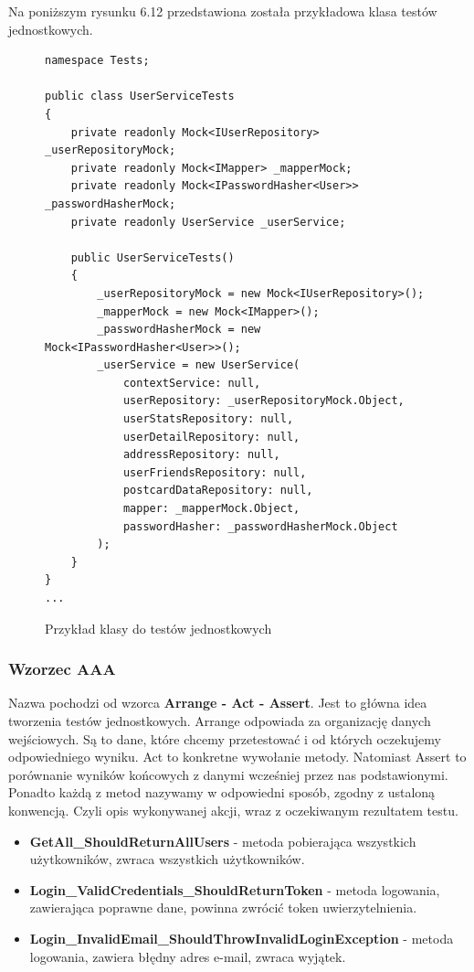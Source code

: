 \documentclass[a4paper,twoside,12pt]{book}
\begin{document}
Na poniższym rysunku 6.12 przedstawiona została przykładowa klasa testów jednostkowych.
    \begin{figure}[H]
        \begin{lstlisting}
namespace Tests;

public class UserServiceTests
{
    private readonly Mock<IUserRepository> _userRepositoryMock;
    private readonly Mock<IMapper> _mapperMock;
    private readonly Mock<IPasswordHasher<User>> _passwordHasherMock;
    private readonly UserService _userService;

    public UserServiceTests()
    {
        _userRepositoryMock = new Mock<IUserRepository>();
        _mapperMock = new Mock<IMapper>();
        _passwordHasherMock = new Mock<IPasswordHasher<User>>();
        _userService = new UserService(
            contextService: null,
            userRepository: _userRepositoryMock.Object,
            userStatsRepository: null,
            userDetailRepository: null,
            addressRepository: null,
            userFriendsRepository: null,
            postcardDataRepository: null,
            mapper: _mapperMock.Object,
            passwordHasher: _passwordHasherMock.Object
        );
    }
}
...
        \end{lstlisting}
    \caption{Przykład klasy do testów jednostkowych}
    \label{fig:pseudokod:listings}
    \end{figure}

\subsubsection{Wzorzec AAA}
Nazwa pochodzi od wzorca \textbf{Arrange - Act - Assert}. Jest to główna idea tworzenia testów jednostkowych. Arrange odpowiada za organizację danych wejściowych. Są to dane, które chcemy przetestować i od których oczekujemy odpowiedniego wyniku. Act to konkretne wywołanie metody. Natomiast Assert to porównanie wyników końcowych z danymi wcześniej przez nas podstawionymi. Ponadto każdą z metod nazywamy w odpowiedni sposób, zgodny z ustaloną konwencją. Czyli opis wykonywanej akcji, wraz z oczekiwanym rezultatem testu.
\begin{itemize}
    \item \textbf{GetAll\_ShouldReturnAllUsers} - metoda pobierająca wszystkich użytkowników, zwraca wszystkich użytkowników.
    \item \textbf{Login\_ValidCredentials\_ShouldReturnToken} - metoda logowania, zawierająca poprawne dane, powinna zwrócić token uwierzytelnienia.
    \item \textbf{Login\_InvalidEmail\_ShouldThrowInvalidLoginException} - metoda logowania, zawiera błędny adres e-mail, zwraca wyjątek.
\end{itemize}
\end{document}
